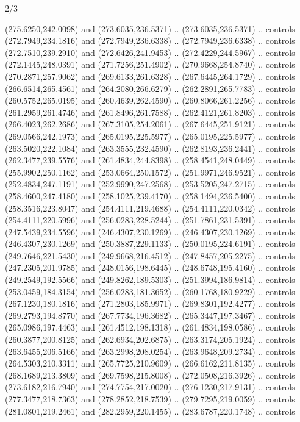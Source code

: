 \begin{flagdescription}{2/3}
\begin{scope}[xshift=0.5\flaglength,yshift=0.5\flagwidth,scale=\flagwidth/318.91]
\begin{scope}[y=0.8pt, x=0.8pt, yscale=-1,shift={(-298.97,-199.32)}]
  (275.6250,242.0098) and (273.6035,236.5371) .. (273.6035,236.5371) .. controls
  (272.7949,234.1816) and (272.7949,236.6338) .. (272.7949,236.6338) .. controls
  (272.7510,239.2910) and (272.6426,241.9453) .. (272.4229,244.5967) .. controls
  (272.1445,248.0391) and (271.7256,251.4902) .. (270.9668,254.8740) .. controls
  (270.2871,257.9062) and (269.6133,261.6328) .. (267.6445,264.1729) .. controls
  (266.6514,265.4561) and (264.2080,266.6279) .. (262.2891,265.7783) .. controls
  (260.5752,265.0195) and (260.4639,262.4590) .. (260.8066,261.2256) .. controls
  (261.2959,261.4746) and (261.8496,261.7588) .. (262.4121,261.8203) .. controls
  (266.4023,262.2686) and (267.3105,254.2061) .. (267.6445,251.9121) .. controls
  (269.0566,242.1973) and (265.0195,225.5977) .. (265.0195,225.5977) .. controls
  (263.5020,222.1084) and (263.3555,232.4590) .. (262.8193,236.2441) .. controls
  (262.3477,239.5576) and (261.4834,244.8398) .. (258.4541,248.0449) .. controls
  (255.9902,250.1162) and (253.0664,250.1572) .. (251.9971,246.9521) .. controls
  (252.4834,247.1191) and (252.9990,247.2568) .. (253.5205,247.2715) .. controls
  (258.4600,247.4180) and (258.1025,239.4170) .. (258.1494,236.5400) .. controls
  (258.3516,223.8047) and (254.4111,219.4688) .. (254.4111,220.0342) .. controls
  (254.4111,220.5996) and (256.0283,228.5244) .. (251.7861,231.5391) .. controls
  (247.5439,234.5596) and (246.4307,230.1269) .. (246.4307,230.1269) .. controls
  (246.4307,230.1269) and (250.3887,229.1133) .. (250.0195,224.6191) .. controls
  (249.7646,221.5430) and (249.9668,216.4512) .. (247.8457,205.2275) .. controls
  (247.2305,201.9785) and (248.0156,198.6445) .. (248.6748,195.4160) .. controls
  (249.2549,192.5566) and (249.8262,189.5303) .. (251.3994,186.9814) .. controls
  (253.0459,184.3154) and (256.0283,181.3652) .. (260.1768,180.9229) .. controls
  (267.1230,180.1816) and (271.2803,185.9971) .. (269.8301,192.4277) .. controls
  (269.2793,194.8770) and (267.7734,196.3682) .. (265.3447,197.3467) .. controls
  (265.0986,197.4463) and (261.4512,198.1318) .. (261.4834,198.0586) .. controls
  (260.3877,200.8125) and (262.6934,202.6875) .. (263.3174,205.1924) .. controls
  (263.6455,206.5166) and (263.2998,208.0254) .. (263.9648,209.2734) .. controls
  (264.5303,210.3311) and (265.7725,210.9609) .. (266.6162,211.8135) .. controls
  (268.1689,213.3809) and (269.7598,215.8008) .. (272.0508,216.3926) .. controls
  (273.6182,216.7940) and (274.7754,217.0020) .. (276.1230,217.9131) .. controls
  (277.3477,218.7363) and (278.2852,218.7539) .. (279.7295,219.0059) .. controls
  (281.0801,219.2461) and (282.2959,220.1455) .. (283.6787,220.1748) .. controls

\end{scope}
\end{scope}
\end{flagdescription}
